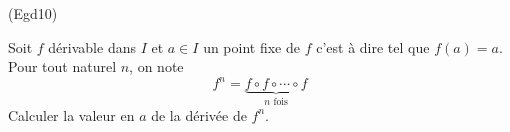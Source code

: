 \begin{tiny}(Egd10)\end{tiny}
Soit $f$ dérivable dans $I$ et $a\in I$ un point fixe de $f$ c'est à dire tel que $f(a)=a$. Pour tout naturel $n$, on note
\begin{displaymath}
 f^n = \underset{n \text{ fois}}{\underbrace{f\circ f \circ \cdots \circ f}}
\end{displaymath}
Calculer la valeur en $a$ de la dérivée de $f^n$.
